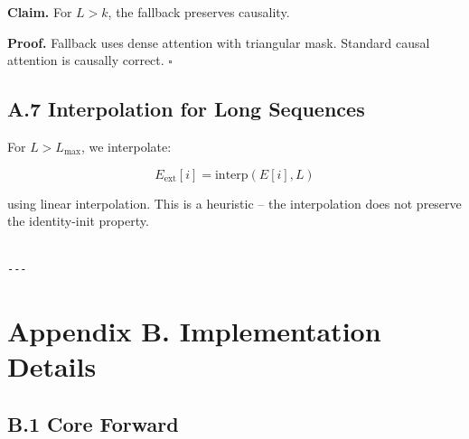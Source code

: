 \textbf{Claim.} For $L > k$, the fallback preserves causality.

\textbf{Proof.} Fallback uses dense attention with triangular mask. Standard 
causal attention is causally correct. $\square$

\subsection{A.7 Interpolation for Long Sequences}

For $L > L_\text{max}$, we interpolate:

\[
E_\text{ext}[i] = \text{interp}(E[i], L)
\tag{A.7}
\]

using linear interpolation. This is a heuristic -- the interpolation does 
not preserve the identity-init property.
\begin{lstlisting}

---
\end{lstlisting}

\section{Appendix B. Implementation Details}

\subsection{B.1 Core Forward}

